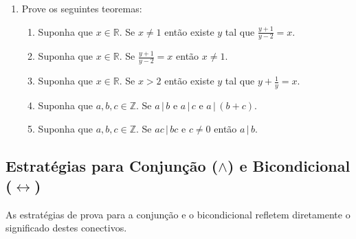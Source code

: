 \begin{enumerate}
  \item Prove os seguintes teoremas:
   \begin{enumerate}
     \item Suponha que $x\in\mathbb{R}$. Se $x\neq 1$ então existe $y$
       tal que $\frac{y+1}{y-2}= x$.
     \item Suponha que $x\in\mathbb{R}$. Se $\frac{y+1}{y-2}= x$ então
       $x\neq 1$.
     \item Suponha que $x\in\mathbb{R}$. Se $x > 2$ então existe $y$
       tal que $y + \frac{1}{y} = x$.
     \item Suponha que $a,b,c\in\mathbb{Z}$. Se $a\,|\,b$ e $a\,|\,c$ e
       $a\,|\,(b+c)$.
     \item Suponha que $a,b,c\in\mathbb{Z}$. Se $ac\,|\,bc$ e $c\neq
       0$ então $a\,|\,b$.
   \end{enumerate}
\end{enumerate}

\subsection{Estratégias para Conjunção ($\land$) e Bicondicional
  ($\leftrightarrow$)}

As estratégias de prova para a conjunção e o bicondicional refletem
diretamente o significado destes conectivos.

